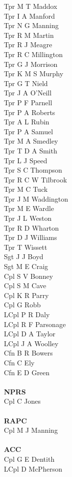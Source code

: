 \begin{multicols}{4}
  Tpr M T Maddox \\
  Tpr I A Manford \\
  Tpr N G Manning \\
  Tpr R M Martin \\
  Tpr R J Meagre \\
  Tpr R C Millington \\
  Tpr G J Morrison \\
  Tpr K M S Murphy \\
  Tpr G T Nield \\
  Tpr J A O'Neill \\
  Tpr P F Parnell \\
  Tpr P A Roberts \\
  Tpr A L Rubin \\
  Tpr P A Samuel \\
  Tpr M A Smedley \\
  Tpr T D A Smith \\
  Tpr L J Speed \\
  Tpr S C Thompson \\
  Tpr R C W Tilbrook \\
  Tpr M C Tuck \\
  Tpr J M Waddington \\
  Tpr M E Wardle \\
  Tpr J L Weston \\
  Tpr R D Wharton \\
  Tpr D J Williams \\
  Tpr T Wissett \\
  Sgt J J Boyd \\
  Sgt M E Craig \\
  Cpl S V Bonney \\
  Cpl S M Cave \\
  Cpl K R Parry \\
  Cpl G Robb \\
  LCpl P R Daly \\
  LCpl R F Parsonage \\
  LCpl D A Taylor \\
  LCpl J A Woolley \\
  Cfn B R Bowers \\
  Cfn C Ely \\
  Cfn E D Green \\
  \\
  \textbf{NPRS} \\
  Cpl C Jones \\
  \\
  \textbf{RAPC} \\
  Cpl M J Manning \\
  \\
  \textbf{ACC} \\
  Cpl G E Dentith \\
  LCpl D McPherson
\end{multicols}

\pagebreak
